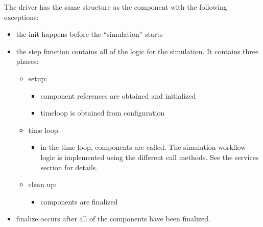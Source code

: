 The driver has the same structure as the component with the following
exceptions:
\begin{itemize}
  \item the init happens before the ``simulation'' starts
  \item the step function contains all of the logic for the simulation.  It contains three phases:
    \begin{itemize}
       \item setup:
       \begin{itemize}
         \item component references are obtained and initialized
         \item timeloop is obtained from configuration
       \end{itemize} 
       \item time loop:
       \begin{itemize}
         \item in the time loop, components are called.  The simulation workflow 
          logic is implemented using the different call methods.  See the 
          services section for details.
       \end{itemize}
       \item clean up:
         \begin{itemize}
           \item components are finalized
         \end{itemize}
     \end{itemize}
  \item finalize occurs after all of the components have been finalized.
\end{itemize}

